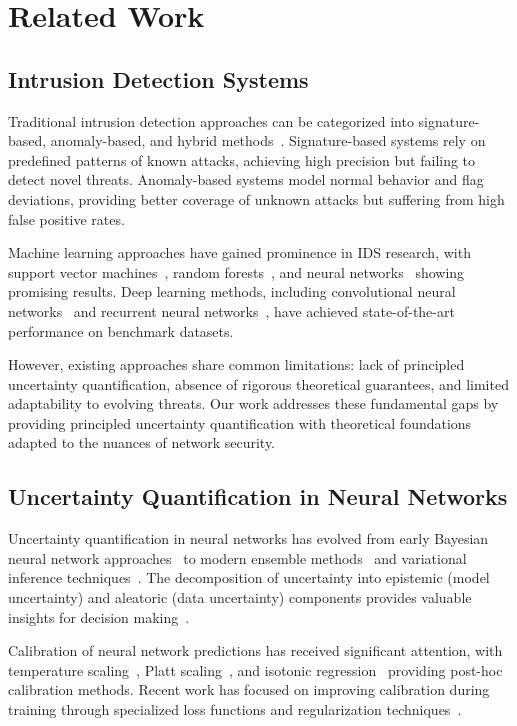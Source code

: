 \documentclass[journal]{IEEEtran}
\begin{document}
\section{Related Work}

\subsection{Intrusion Detection Systems}

Traditional intrusion detection approaches can be categorized into signature-based, anomaly-based, and hybrid methods~\cite{garcia2014survey}. Signature-based systems rely on predefined patterns of known attacks, achieving high precision but failing to detect novel threats. Anomaly-based systems model normal behavior and flag deviations, providing better coverage of unknown attacks but suffering from high false positive rates.

Machine learning approaches have gained prominence in IDS research, with support vector machines~\cite{mukkamala2002intrusion}, random forests~\cite{breiman2001random}, and neural networks~\cite{cannady1998artificial} showing promising results. Deep learning methods, including convolutional neural networks~\cite{vinayakumar2017deep} and recurrent neural networks~\cite{yin2017deep}, have achieved state-of-the-art performance on benchmark datasets.

However, existing approaches share common limitations: lack of principled uncertainty quantification, absence of rigorous theoretical guarantees, and limited adaptability to evolving threats. Our work addresses these fundamental gaps by providing principled uncertainty quantification with theoretical foundations adapted to the nuances of network security.

\subsection{Uncertainty Quantification in Neural Networks}

Uncertainty quantification in neural networks has evolved from early Bayesian neural network approaches~\cite{mackay1992practical} to modern ensemble methods~\cite{lakshminarayanan2017simple} and variational inference techniques~\cite{blundell2015weight}. The decomposition of uncertainty into epistemic (model uncertainty) and aleatoric (data uncertainty) components provides valuable insights for decision making~\cite{kendall2017uncertainties}.

Calibration of neural network predictions has received significant attention, with temperature scaling~\cite{guo2017calibration}, Platt scaling~\cite{platt1999probabilistic}, and isotonic regression~\cite{zadrozny2002transforming} providing post-hoc calibration methods. Recent work has focused on improving calibration during training through specialized loss functions and regularization techniques~\cite{kumar2019verified}.
\end{document}
